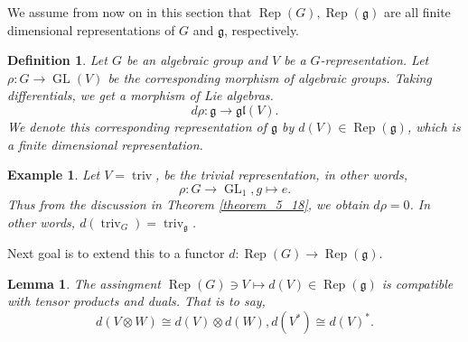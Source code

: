 \documentclass[10pt]{article}
\newtheorem{definition}{Definition}[section]
\newtheorem{lemma}{Lemma}[section]
\newtheorem{example}{Example}[section]
\numberwithin{equation}{theorem}
\DeclareMathOperator{\triv}{triv}
\DeclareMathOperator{\GL}{GL}
\DeclareMathOperator{\Rep}{Rep}
\newcommand{\g}[0]{\mathfrak{g}}
\newcommand{\gl}[0]{\mathfrak{gl}}
\begin{document}
We assume from now on in this section that $\Rep(G),\Rep(\g)$ are all finite dimensional representations of $G$ and $\g$, respectively.
\begin{definition}
Let $G$ be an algebraic group and $V$ be a $G$-representation. Let $\rho:G\to\GL(V)$ be the corresponding morphism of algebraic groups. Taking differentials, we get a morphism of Lie algebras. 
\begin{equation*}
  d\rho:\g\to\gl(V).
\end{equation*}
We denote this corresponding representation of $\g$ by $d(V)\in\Rep(\g)$, which is a finite dimensional representation.
\end{definition}
\begin{example}
  Let $V=\triv$, be the trivial representation, in other words,
  \begin{equation*}
    \rho:G\to\GL_1, g\mapsto e.
  \end{equation*}
  Thus from the discussion in Theorem \ref{theorem_5_18}, we obtain $d\rho = 0$. In other words, $d(\triv_G)=\triv_{\g}$.
\end{example}
Next goal is to extend this to a functor $d:\Rep(G)\to\Rep(\g)$.
\begin{lemma}
  \label{lemma_5_20}
  The assingment $\Rep(G)\ni V\mapsto d(V)\in\Rep(\g)$ is compatible with tensor products and duals. That is to say,
  \begin{equation*}
    d(V\otimes W) \cong d(V)\otimes d(W), d(V^*) \cong d(V)^*.
  \end{equation*}
\end{lemma}
\end{document}
